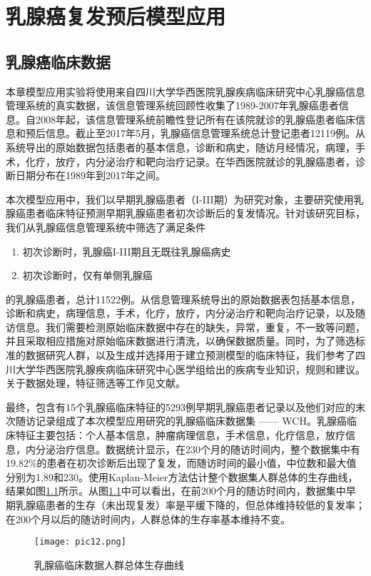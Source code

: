\chapter{乳腺癌复发预后模型应用}

\section{乳腺癌临床数据}
本章模型应用实验将使用来自四川大学华西医院乳腺疾病临床研究中心乳腺癌信息管理系统的真实数据，该信息管理系统回顾性收集了1989-2007年乳腺癌患者信息。自2008年起，该信息管理系统前瞻性登记所有在该院就诊的乳腺癌患者临床信息和预后信息。截止至2017年5月，乳腺癌信息管理系统总计登记患者12119例。从系统导出的原始数据包括患者的基本信息，诊断和病史，随访月经情况，病理，手术，化疗，放疗，内分泌治疗和靶向治疗记录。在华西医院就诊的乳腺癌患者，诊断日期分布在1989年到2017年之间。

本次模型应用中，我们以早期乳腺癌患者（I-III期）为研究对象，主要研究使用乳腺癌患者临床特征预测早期乳腺癌患者初次诊断后的复发情况。针对该研究目标，我们从乳腺癌信息管理系统中筛选了满足条件
\begin{enumerate}
	\item 初次诊断时，乳腺癌I-III期且无既往乳腺癌病史
	\item 初次诊断时，仅有单侧乳腺癌
\end{enumerate}
的乳腺癌患者，总计11522例。从信息管理系统导出的原始数据表包括基本信息，诊断和病史，病理信息，手术，化疗，放疗，内分泌治疗和靶向治疗记录，以及随访信息。我们需要检测原始临床数据中存在的缺失，异常，重复，不一致等问题，并且采取相应措施对原始临床数据进行清洗，以确保数据质量。同时，为了筛选标准的数据研究人群，以及生成并选择用于建立预测模型的临床特征，我们参考了四川大学华西医院乳腺疾病临床研究中心医学组给出的疾病专业知识，规则和建议。关于数据处理，特征筛选等工作见文献\cite{fu2018tbme}。

最终，包含有15个乳腺癌临床特征的5293例早期乳腺癌患者记录以及他们对应的末次随访记录组成了本次模型应用研究的乳腺癌临床数据集 —— WCH。乳腺癌临床特征主要包括：个人基本信息，肿瘤病理信息，手术信息，化疗信息，放疗信息，内分泌治疗信息。数据统计显示，在230个月的随访时间内，整个数据集中有19.82\%的患者在初次诊断后出现了复发，而随访时间的最小值，中位数和最大值分别为1,89和230。使用Kaplan-Meier方法估计整个数据集人群总体的生存曲线，结果如图\ref{pic12}所示。从图\ref{pic12}中可以看出，在前200个月的随访时间内，数据集中早期乳腺癌患者的生存（未出现复发）率是平缓下降的，但总体维持较低的复发率；在200个月以后的随访时间内，人群总体的生存率基本维持不变。

\begin{figure}[H]
\texttt{[image: pic12.png]}
\caption{乳腺癌临床数据人群总体生存曲线}
\label{pic12}
\end{figure}

